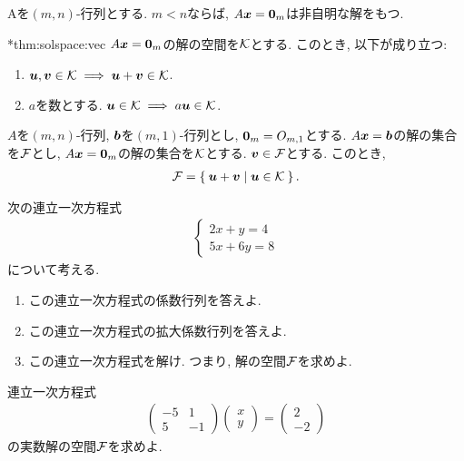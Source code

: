 \begin{cor}
  Aを$(m,n)$-行列とする.
  $m<n$ならば,
  $A\boldsymbol{x}=\boldsymbol{0}_m$は非自明な解をもつ.
\end{cor}

\begin{prop}
  \provelater**{thm:solspace:vec}
  \label{thm:ker:vec}
  $A\boldsymbol{x}=\boldsymbol{0}_m$の解の空間を$\mathcal{K}$とする.
  このとき, 以下が成り立つ:
  \begin{enumerate}
  \item
    $\boldsymbol{u},\boldsymbol{v}\in \mathcal{K}\implies \boldsymbol{u}+\boldsymbol{v}\in\mathcal{K}$.
  \item
    $a$を数とする. $\boldsymbol{u}\in \mathcal{K}\implies a\boldsymbol{u}\in\mathcal{K}$.
  \end{enumerate}
\end{prop}

\begin{theorem}
  $A$を$(m,n)$-行列,
  $\boldsymbol{b}$を$(m,1)$-行列とし,
  $\boldsymbol{0}_m=O_{m,1}$とする.
  $A\boldsymbol{x}=\boldsymbol{b}$の解の集合を$\mathcal{F}$とし,
  $A\boldsymbol{x}=\boldsymbol{0}_m$の解の集合を$\mathcal{K}$とする.
  $\boldsymbol{v}\in \mathcal{F}$とする.
  このとき,
  \begin{align*}
    \mathcal{F}=\Set{\boldsymbol{u}+\boldsymbol{v}|\boldsymbol{u}\in \mathcal{K}}.
  \end{align*}
\end{theorem}


\begin{quiz}
  \label{quiz:3:2}
  次の連立一次方程式
  \begin{align*}
    \begin{cases}
      2x+y=4\\
      5x+6y=8
      \end{cases}
  \end{align*}
  について考える.
  \begin{enumerate}
    \item この連立一次方程式の係数行列を答えよ.
    \item この連立一次方程式の拡大係数行列を答えよ.
    \item この連立一次方程式を解け.
      つまり, 解の空間$\mathcal{F}$を求めよ.
  \end{enumerate}
\end{quiz}

\begin{quiz}
  \label{quiz:3:3}
  連立一次方程式
  \begin{align*}
    \begin{pmatrix}-5&1\\5&-1\end{pmatrix}
    \begin{pmatrix}x\\y\end{pmatrix}
      =
      \begin{pmatrix}2\\-2\end{pmatrix}
  \end{align*}
  の実数解の空間$\mathcal{F}$を求めよ.
\end{quiz}

